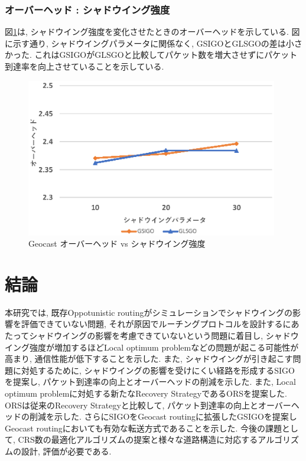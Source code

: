 \documentclass[10pt]{jreport}
\begin{document}
\subsection{オーバーヘッド : シャドウイング強度}

図\ref{fig:GSIGO_overhead_shadow}は, シャドウイング強度を変化させたときのオーバーヘッドを示している.
図に示す通り, シャドウイングパラメータに関係なく, GSIGOとGLSGOの差は小さかった. これはGSIGOがGLSGOと比較してパケット数を増大させずにパケット到達率を向上させていることを示している.

\begin{figure}[!ht]
	\centering
	\includegraphics[width=110mm]{figures/GSIGO_overhead_shadow.eps}
	\caption{Geocast オーバーヘッド vs シャドウイング強度}
	\label{fig:GSIGO_overhead_shadow}
\end{figure}




\chapter{結論}
\label{Conclusion}
本研究では, 既存Oppotunistic routingがシミュレーションでシャドウイングの影響を評価できていない問題, それが原因でルーチングプロトコルを設計するにあたってシャドウイングの影響を考慮できていないという問題に着目し, シャドウイング強度が増加するほどLocal optimum problemなどの問題が起こる可能性が高まり, 通信性能が低下することを示した. また, シャドウイングが引き起こす問題に対処するために, シャドウイングの影響を受けにくい経路を形成するSIGOを提案し, パケット到達率の向上とオーバーヘッドの削減を示した. また, Local optimum problemに対処する新たなRecovery StrategyであるORSを提案した. ORSは従来のRecovery Strategyと比較して, パケット到達率の向上とオーバーヘッドの削減を示した. さらにSIGOをGeocast routingに拡張したGSIGOを提案しGeocast routingにおいても有効な転送方式であることを示した. 今後の課題として, CRS数の最適化アルゴリズムの提案と様々な道路構造に対応するアルゴリズムの設計, 評価が必要である.
\end{document}

